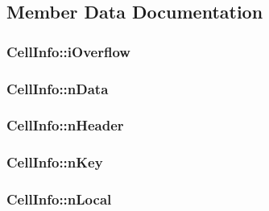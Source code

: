 \subsection{Member Data Documentation}
\hypertarget{struct_cell_info_af7be0161f1c67600aeba783a68972f70}{
\subsubsection[{i\-Overflow}]{ Cell\-Info\-::i\-Overflow}}\label{struct_cell_info_af7be0161f1c67600aeba783a68972f70}
\hypertarget{struct_cell_info_af2301ed16c35633ec6b5d7792734a4bf}{
\subsubsection[{n\-Data}]{ Cell\-Info\-::n\-Data}}\label{struct_cell_info_af2301ed16c35633ec6b5d7792734a4bf}
\hypertarget{struct_cell_info_a99bb1f87208f793359cf63e3d164025b}{
\subsubsection[{n\-Header}]{ Cell\-Info\-::n\-Header}}\label{struct_cell_info_a99bb1f87208f793359cf63e3d164025b}
\hypertarget{struct_cell_info_a542b041b9a54a13f7c6f2fe63e7542c0}{
\subsubsection[{n\-Key}]{ Cell\-Info\-::n\-Key}}\label{struct_cell_info_a542b041b9a54a13f7c6f2fe63e7542c0}
\hypertarget{struct_cell_info_a8cedbcc2c94916fe5798b502c614bb08}{
\subsubsection[{n\-Local}]{ Cell\-Info\-::n\-Local}}\label{struct_cell_info_a8cedbcc2c94916fe5798b502c614bb08}
